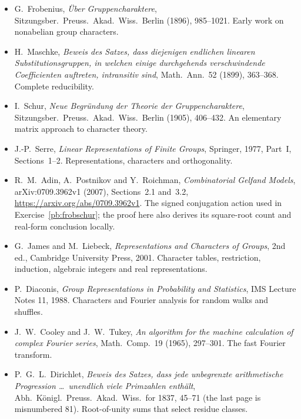 \begin{itemize}
\item G.~Frobenius, \emph{Über Gruppencharaktere}, Sitzungsber.\ Preuss.\ Akad.\ Wiss.\ Berlin (1896), 985--1021. Early work on nonabelian group characters.
\item H.~Maschke, \emph{Beweis des Satzes, dass diejenigen endlichen linearen Substitutionsgruppen, in welchen einige durchgehends verschwindende Coefficienten auftreten, intransitiv sind}, Math.\ Ann.\ 52 (1899), 363--368. Complete reducibility.
\item I.~Schur, \emph{Neue Begründung der Theorie der Gruppencharaktere}, Sitzungsber.\ Preuss.\ Akad.\ Wiss.\ Berlin (1905), 406--432. An elementary matrix approach to character theory.
\item J.-P.~Serre, \emph{Linear Representations of Finite Groups}, Springer, 1977, Part~I, Sections~1--2. Representations, characters and orthogonality.
\item R.~M.~Adin, A.~Postnikov and Y.~Roichman, \emph{Combinatorial Gelfand Models}, arXiv:0709.3962v1 (2007), Sections~2.1 and~3.2, \url{https://arxiv.org/abs/0709.3962v1}. The signed conjugation action used in Exercise~\ref{pb:frobschur}; the proof here also derives its square-root count and real-form conclusion locally.
\item G.~James and M.~Liebeck, \emph{Representations and Characters of Groups}, 2nd ed., Cambridge University Press, 2001. Character tables, restriction, induction, algebraic integers and real representations.
\item P.~Diaconis, \emph{Group Representations in Probability and Statistics}, IMS Lecture Notes 11, 1988. Characters and Fourier analysis for random walks and shuffles.
\item J.~W.~Cooley and J.~W.~Tukey, \emph{An algorithm for the machine calculation of complex Fourier series}, Math.\ Comp.\ 19 (1965), 297--301. The fast Fourier transform.
\item P.~G.~L.~Dirichlet, \emph{Beweis des Satzes, dass jede unbegrenzte arithmetische Progression \dots\ unendlich viele Primzahlen enthält}, Abh.\ Königl.\ Preuss.\ Akad.\ Wiss.\ for 1837, 45--71 (the last page is misnumbered 81). Root-of-unity sums that select residue classes.
\end{itemize}
